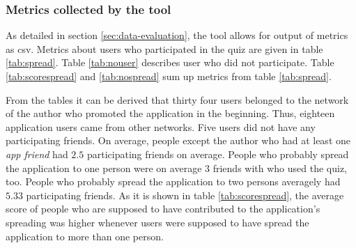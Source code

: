 \documentclass[preprint,12pt]{elsarticle}
\begin{document}




\subsubsection{Metrics collected by the tool}
\label{sec:tool-metrics}
As detailed in section \ref{sec:data-evaluation}, the tool allows for
output of metrics as \ac{csv}. Metrics about users who participated in
the quiz are given in table
\ref{tab:spread}. Table \ref{tab:nouser}
describes user who did not participate. Table \ref{tab:scorespread}
and \ref{tab:nospread} sum up metrics from table \ref{tab:spread}.

From the tables it can be derived that thirty four users belonged to the
network of the author who promoted the application in the beginning. Thus, eighteen
application users came from other networks. Five users did not have any
participating friends. On average, people except the author
who had at least one \textit{app friend} had $2.5$ participating
friends on average. People who probably spread the application to 
one person were on average $3$ friends with who used the quiz, too. People
who probably spread the application to two persons averagely had $5.33$
participating friends. As it is shown in table \ref{tab:scorespread},
the average score of people who are supposed to have contributed to
the application's spreading was higher whenever users were supposed to have spread
the application to more than one person.

\end{document}
